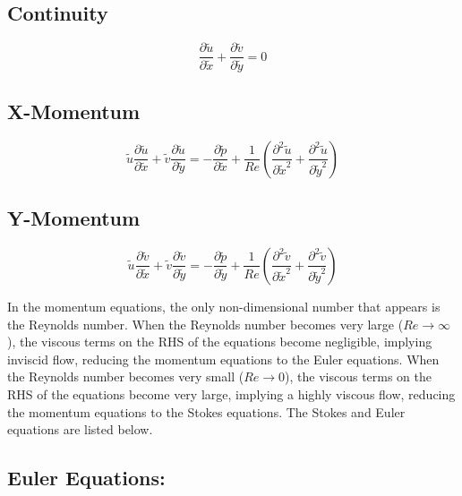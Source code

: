 \documentclass[11pt]{article}
\begin{document}
\subsection*{Continuity}
\begin{equation*}
    \frac{\partial \tilde{u}}{\partial \tilde{x}} + \frac{\partial \tilde{v}}{\partial \tilde{y}} = 0
\end{equation*}

\subsection*{X-Momentum}
\begin{equation*}
    \tilde{u} \frac{\partial \tilde{u}}{\partial \tilde{x}} + \tilde{v} \frac{\partial \tilde{u}}{\partial \tilde{y}} = -\frac{\partial \tilde{p}}{\partial \tilde{x}} + \frac{1}{Re}\left(\frac{\partial^2 \tilde{u}}{\partial \tilde{x}^2} + \frac{\partial^2 \tilde{u}}{\partial \tilde{y}^2}\right)
\end{equation*}

\subsection*{Y-Momentum}
\begin{equation*}
    \tilde{u} \frac{\partial \tilde{v}}{\partial \tilde{x}} + \tilde{v} \frac{\partial \tilde{v}}{\partial \tilde{y}} = -\frac{\partial \tilde{p}}{\partial \tilde{y}} + \frac{1}{Re}\left(\frac{\partial^2 \tilde{v}}{\partial \tilde{x}^2} + \frac{\partial^2 \tilde{v}}{\partial \tilde{y}^2}\right)
\end{equation*}
\vspace{2.5mm}

In the momentum equations, the only non-dimensional number that appears is the Reynolds number. When the Reynolds number becomes very large ($Re \rightarrow \infty$), the viscous terms on the RHS of the equations become negligible, implying inviscid flow, reducing the momentum equations to the Euler equations. When the Reynolds number becomes very small ($Re \rightarrow 0$), the viscous terms on the RHS of the equations become very large, implying a highly viscous flow, reducing the momentum equations to the Stokes equations. The Stokes and Euler equations are listed below. 
\vspace{5mm}

\subsection*{Euler Equations:}
\end{document}
